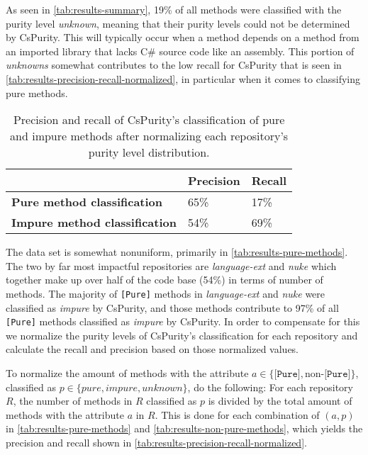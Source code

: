 \documentclass[a4paper,12pt]{article}
\begin{document}
As seen in \autoref{tab:results-summary}, 19\% of all methods were classified with the purity level \textit{unknown}, meaning that their purity levels could not be determined by CsPurity. This will typically occur when a method depends on a method from an imported library that lacks C\# source code like an assembly. This portion of \textit{unknowns} somewhat contributes to the low recall for CsPurity that is seen in \autoref{tab:results-precision-recall-normalized}, in particular when it comes to classifying pure methods.

\begin{table}[H]
  \centering
  \caption{Precision and recall of CsPurity's classification of pure and impure methods after normalizing each repository's purity level distribution.}
  \label{tab:results-precision-recall-normalized}
  \begin{tabular}{|l|ll|}
    \hline
                                          & \textbf{Precision} & \textbf{Recall} \\
    \hline
    \textbf{Pure method classification}   & 65\%                            & 17\%                         \\
    \textbf{Impure method classification} & 54\%                            & 69\%                         \\
    \hline
  \end{tabular}
\end{table}

The data set is somewhat nonuniform, primarily in \autoref{tab:results-pure-methods}. The two by far most impactful repositories are \textit{language-ext} and \textit{nuke} which together make up over half of the code base (54\%) in terms of number of methods. The majority of \texttt{[Pure]} methods in \textit{language-ext} and \textit{nuke} were classified as \textit{impure} by CsPurity, and those methods contribute to 97\% of all \texttt{[Pure]} methods classified as \textit{impure} by CsPurity. In order to compensate for this we normalize the purity levels of CsPurity's classification for each repository and calculate the recall and precision based on those normalized values.

To normalize the amount of methods with the attribute $a \in \{\texttt{[Pure]}, \text{non-}\texttt{[Pure]}\}$, classified as $p \in \{pure, impure, unknown\}$, do the following: For each repository $R$, the number of methods in $R$ classified as $p$ is divided by the total amount of methods with the attribute $a$ in $R$. %
This is done for each combination of $(a, p)$ in \autoref{tab:results-pure-methods} and \autoref{tab:results-non-pure-methods}, which yields the precision and recall shown in \autoref{tab:results-precision-recall-normalized}.
\end{document}
